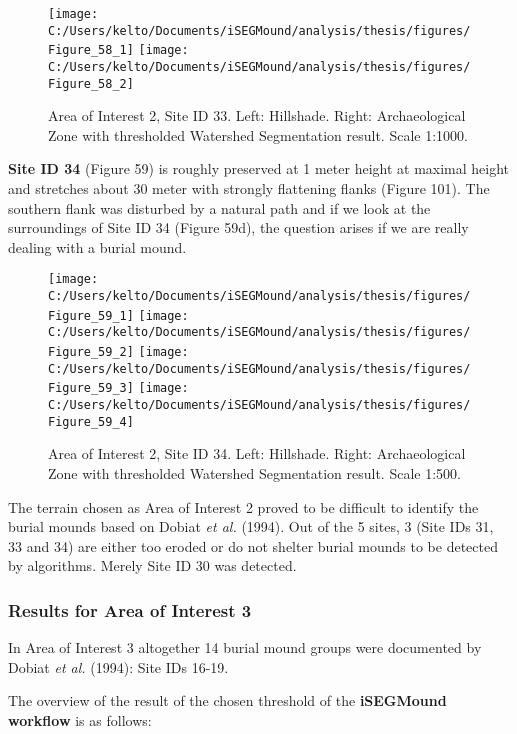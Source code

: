 \documentclass[
  12pt,
]{article}
\begin{document}
\begin{figure}
\texttt{[image: C:/Users/kelto/Documents/iSEGMound/analysis/thesis/figures/Figure\_58\_1]} \texttt{[image: C:/Users/kelto/Documents/iSEGMound/analysis/thesis/figures/Figure\_58\_2]} \caption{Area of Interest 2, Site ID 33. Left: Hillshade. Right: Archaeological Zone with thresholded Watershed Segmentation result. Scale 1:1000.}\label{fig:Figure58}
\end{figure}

\textbf{Site ID 34} (Figure 59) is roughly preserved at 1 meter height at maximal height and stretches about 30 meter with strongly flattening flanks (Figure 101). The southern flank was disturbed by a natural path and if we look at the surroundings of Site ID 34 (Figure 59d), the question arises if we are really dealing with a burial mound.

\begin{figure}
\texttt{[image: C:/Users/kelto/Documents/iSEGMound/analysis/thesis/figures/Figure\_59\_1]} \texttt{[image: C:/Users/kelto/Documents/iSEGMound/analysis/thesis/figures/Figure\_59\_2]} \texttt{[image: C:/Users/kelto/Documents/iSEGMound/analysis/thesis/figures/Figure\_59\_3]} \texttt{[image: C:/Users/kelto/Documents/iSEGMound/analysis/thesis/figures/Figure\_59\_4]} \caption{Area of Interest 2, Site ID 34. Left: Hillshade. Right: Archaeological Zone with thresholded Watershed Segmentation result. Scale 1:500.}\label{fig:Figure59}
\end{figure}

The terrain chosen as Area of Interest 2 proved to be difficult to identify the burial mounds based on Dobiat \emph{et al.} (1994). Out of the 5 sites, 3 (Site IDs 31, 33 and 34) are either too eroded or do not shelter burial mounds to be detected by algorithms. Merely Site ID 30 was detected.

\hypertarget{results-for-area-of-interest-3}{%
\subsubsection{\texorpdfstring{\textbf{Results for Area of Interest 3}}{Results for Area of Interest 3}}\label{results-for-area-of-interest-3}}

In Area of Interest 3 altogether 14 burial mound groups were documented by Dobiat \emph{et al.} (1994): Site IDs 16-19.

The overview of the result of the chosen threshold of the \textbf{iSEGMound workflow} is as follows:
\end{document}
